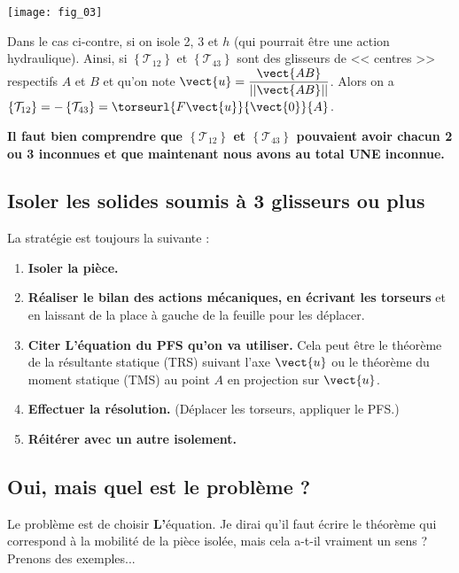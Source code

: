 \begin{minipage}[c]{.4\linewidth}
\begin{center}
\texttt{[image: fig\_03]}
\end{center}
\end{minipage}
\hfill
\begin{minipage}[c]{.55\linewidth}
Dans le cas ci-contre, si on isole 2, 3 et $h$ (qui pourrait être une action hydraulique). Ainsi, si $\left\{\mathcal{T}_{12}\right\}$ et $\left\{\mathcal{T}_{43}\right\}$ sont des glisseurs de << centres >> respectifs $A$ et $B$ et qu'on note $\vect{u}=\dfrac{\vect{AB}}{||\vect{AB}||}$. Alors on a $\left\{\mathcal{T}_{12}\right\}=-\left\{\mathcal{T}_{43}\right\}=\torseurl{F\vect{u}}{\vect{0}}{A}$. 

\textbf{Il faut bien comprendre que $\left\{\mathcal{T}_{12}\right\}$ et $\left\{\mathcal{T}_{43}\right\}$  pouvaient avoir chacun 2 ou 3 inconnues et que maintenant nous avons au total UNE inconnue.}
\end{minipage}

\subsection{Isoler les solides soumis à 3 glisseurs ou plus}

La stratégie est toujours la suivante :
\begin{enumerate}
\item \textbf{Isoler la pièce.}
\item \textbf{Réaliser le bilan des actions mécaniques, en écrivant les torseurs} et en laissant de la place à gauche de la feuille pour les déplacer.
\item \textbf{Citer L'équation du PFS qu'on va utiliser.} Cela peut être le théorème de la résultante statique (TRS) suivant l'axe $\vect{u}$ ou le théorème du moment statique (TMS) au point $A$ en projection sur $\vect{u}$.
\item \textbf{Effectuer la résolution.} (Déplacer les torseurs, appliquer le PFS.)
\item \textbf{Réitérer avec un autre isolement.}
\end{enumerate}

\subsection{Oui, mais quel est le problème ?}

Le problème est de choisir \textbf{\large{L'}}\normalsize équation. Je dirai qu'il faut écrire le théorème qui correspond à la mobilité de la pièce isolée, mais cela a-t-il vraiment un sens ? Prenons des exemples...

